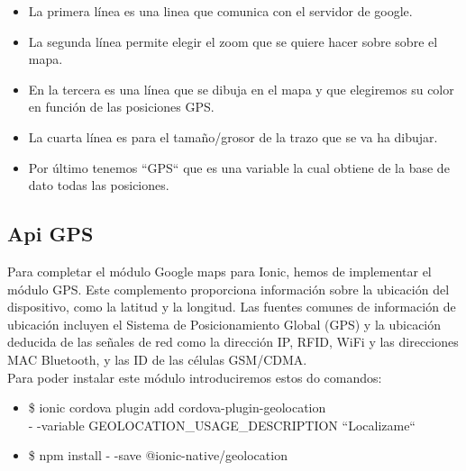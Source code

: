 \documentclass[a4paper, 11pt]{article}
\begin{document}
\begin{itemize}
              \begin{itemize}
                  \item{La primera línea es una linea que comunica con el
                        servidor de google.}
                  \item{La segunda línea permite elegir el zoom que se quiere
                        hacer sobre sobre el mapa.}
                  \item{En la tercera es una línea que se dibuja en el mapa y
                        que elegiremos su color en función de las posiciones
                        GPS.}
                  \item{La cuarta línea es para el tamaño/grosor de la trazo
                        que se va ha dibujar.}
                  \item{Por último tenemos ``{{GPS}}`` que es una variable
                        la cual obtiene de la base de dato todas las posiciones.}
              \end{itemize}

            \subsection{Api GPS}

              Para completar el módulo Google maps para Ionic, hemos de implementar
              el módulo GPS. Este complemento proporciona información sobre la ubicación del
              dispositivo, como la latitud y la longitud. Las fuentes comunes
              de información de ubicación incluyen el Sistema de Posicionamiento
              Global (GPS) y la ubicación deducida de las señales de red como
              la dirección IP, RFID, WiFi y las direcciones MAC Bluetooth, y
              las ID de las células GSM/CDMA.\\

              Para poder instalar este módulo introduciremos estos do comandos:\\
                \begin{itemize}
                    \item{\$ ionic cordova plugin add cordova-plugin-geolocation \\
                            - -variable GEOLOCATION\_USAGE\_DESCRIPTION ``Localizame`` }
                    \item{\$ npm install - -save @ionic-native/geolocation}
                \end{itemize}


\end{itemize}
\end{document}
